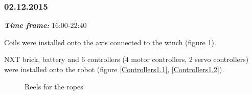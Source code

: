 \subsubsection{02.12.2015}
\textit{\textbf{Time frame:}} 16:00-22:40

Coils were installed onto the axis connected to the winch (figure \ref{Winch1.13}).

NXT brick, battery and 6 controllers (4 motor controllers, 2 servo controllers) were installed onto the robot (figure \ref{Controllers1.1}, \ref{Controllers1.2}).

\begin{figure}[H]
	\begin{minipage}[h]{0.31\linewidth}
		\caption{Reels for the ropes}
		\label{Winch1.13}
	\end{minipage}
	\hfill
	\begin{minipage}[h]{0.31\linewidth}

\end{minipage}
\end{figure}
